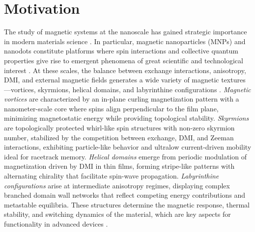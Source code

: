 \documentclass[letterpaper, 12, one column]{article}
\begin{document}
\section{Motivation}


The study of magnetic systems at the nanoscale has gained strategic importance in
modern materials science \cite{Wang2022}. In particular, magnetic nanoparticles (MNPs) and nanodots
constitute platforms where spin interactions and collective quantum properties give
rise to emergent phenomena of great scientific and technological interest \cite{Li2021SelfAssembly}. At these
scales, the balance between exchange interactions, anisotropy, DMI, and external magnetic fields generates a wide variety of magnetic
textures—vortices, skyrmions, helical domains, and labyrinthine configurations \cite{Fert2023}. \textit{Magnetic vortices} are characterized by an in-plane curling magnetization pattern with a nanometer-scale core where spins align perpendicular to the film plane, minimizing magnetostatic energy while providing topological stability. \textit{Skyrmions} are topologically protected whirl-like spin structures with non-zero skyrmion number, stabilized by the competition between exchange, DMI, and Zeeman interactions, exhibiting particle-like behavior and ultralow current-driven mobility ideal for racetrack memory. \textit{Helical domains} emerge from periodic modulation of magnetization driven by DMI in thin films, forming stripe-like patterns with alternating chirality that facilitate spin-wave propagation. \textit{Labyrinthine configurations} arise at intermediate anisotropy regimes, displaying complex branched domain wall networks that reflect competing energy contributions and metastable equilibria. These structures determine the magnetic response, thermal stability, and switching dynamics of the material, which are key aspects for functionality in advanced devices \cite{Bogdanov2020Skyrmions}.

\end{document}
